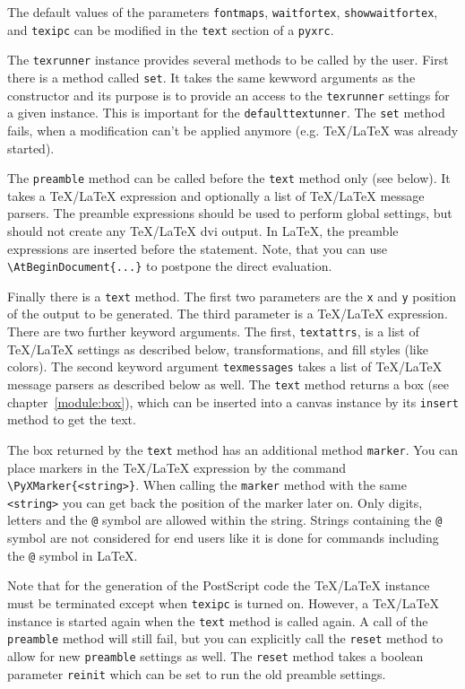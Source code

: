 \medskip

The default values of the parameters \verb|fontmaps|, \verb|waitfortex|,
\verb|showwaitfortex|, and \verb|texipc| can be modified in the \verb|text|
section of a \verb|pyxrc|.

The \verb|texrunner| instance provides several methods to be called by
the user. First there is a method called \verb|set|. It takes the same
kewword arguments as the constructor and its purpose is to provide an
access to the \verb|texrunner| settings for a given instance. This is
important for the \verb|defaulttextunner|. The \verb|set| method
fails, when a modification can't be applied anymore (e.g.
\TeX/\LaTeX{} was already started).

The \verb|preamble| method can be called before the \verb|text| method
only (see below). It takes a \TeX/\LaTeX{} expression and optionally
a list of \TeX/\LaTeX{} message parsers. The preamble expressions should be
used to perform global settings, but should not create any \TeX/\LaTeX{} dvi
output. In \LaTeX, the preamble expressions are inserted before the
\verb|| statement. Note, that you can use
\verb|\AtBeginDocument{...}| to postpone the direct evaluation.

Finally there is a \verb|text| method. The first two parameters are
the \verb|x| and \verb|y| position of the output to be generated. The
third parameter is a \TeX/\LaTeX{} expression. There are two further
keyword arguments. The first, \verb|textattrs|, is a list of
\TeX/\LaTeX{} settings as described below, \PyX{} transformations, and
\PyX{} fill styles (like colors). The second keyword argument
\verb|texmessages| takes a list of \TeX/\LaTeX{} message parsers as
described below as well. The \verb|text| method returns a box (see
chapter~\ref{module:box}), which can be inserted into a canvas
instance by its \verb|insert| method to get the text.

The box returned by the \verb|text| method has an additional method
\verb|marker|. You can place markers in the \TeX/\LaTeX{} expression
by the command \verb|\PyXMarker{<string>}|. When calling the
\verb|marker| method with the same \verb|<string>| you can get back the
position of the marker later on. Only digits, letters and the \verb|@|
symbol are allowed within the string. Strings containing the \verb|@|
symbol are not considered for end users like it is done for commands
including the \verb|@| symbol in \LaTeX{}.

Note that for the generation of the PostScript code the \TeX/\LaTeX{}
instance must be terminated except when \verb|texipc| is turned on.
However, a \TeX/\LaTeX{} instance is started again when the
\verb|text| method is called again. A call of the \verb|preamble|
method will still fail, but you can explicitly call the \verb|reset|
method to allow for new \verb|preamble| settings as well. The
\verb|reset| method takes a boolean parameter \verb|reinit| which can
be set to run the old preamble settings.

